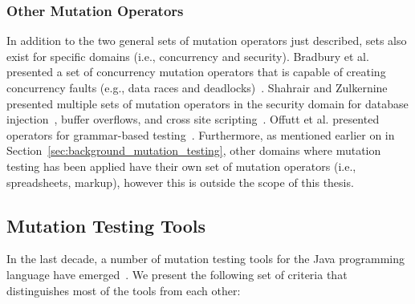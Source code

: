 \subsubsection{Other Mutation Operators}
\label{subsubsec:background_other_operators}
In addition to the two general sets of mutation operators just described, sets also exist for specific domains (i.e., concurrency and security). Bradbury et al. presented a set of concurrency mutation operators that is capable of creating concurrency faults (e.g., data races and deadlocks)~\cite{BCD06}. Shahrair and Zulkernine presented multiple sets of mutation operators in the security domain for database injection~\cite{SZ08b}, buffer overflows\cite{SZ08}, and cross site scripting~\cite{SZ08a}. Offutt et al. presented operators for grammar-based testing~\cite{OAL06}. Furthermore, as mentioned earlier on in Section~\ref{sec:background_mutation_testing}, other domains where mutation testing has been applied have their own set of mutation operators (i.e., spreadsheets, markup), however this is outside the scope of this thesis.


\subsection{Mutation Testing Tools}
\label{subsec:background_mutation_tools}
In the last decade, a number of mutation testing tools for the Java programming language have emerged~\cite{JH10}. We present the following set of criteria that distinguishes most of the tools from each other:

